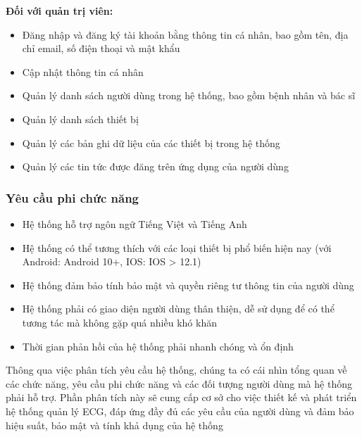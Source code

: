 \textbf{Đối với quản trị viên:}
\begin{adjustwidth}{1.5em}{}
\begin{itemize}
    \item Đăng nhập và đăng ký tài khoản bằng thông tin cá nhân, bao gồm tên, địa chỉ email, số điện thoại và mật khẩu
    \item Cập nhật thông tin cá nhân
    \item Quản lý danh sách người dùng trong hệ thống, bao gồm bệnh nhân và bác sĩ
    \item Quản lý danh sách thiết bị
    \item Quản lý các bản ghi dữ liệu của các thiết bị trong hệ thống
    \item Quản lý các tin tức được đăng trên ứng dụng của người dùng
\end{itemize}
\end{adjustwidth}

\subsubsection{Yêu cầu phi chức năng}
\begin{itemize}
    \item Hệ thống hỗ trợ ngôn ngữ Tiếng Việt và Tiếng Anh
    \item Hệ thống có thể tương thích với các loại thiết bị phổ biến hiện nay (với Android: Android 10+, IOS: IOS > 12.1)
    \item Hệ thống đảm bảo tính bảo mật và quyền riêng tư thông tin của người dùng
    \item Hệ thống phải có giao diện người dùng thân thiện, dễ sử dụng để có thể tương tác mà không gặp quá nhiều khó khăn
    \item Thời gian phản hồi của hệ thống phải nhanh chóng và ổn định
\end{itemize}

Thông qua việc phân tích yêu cầu hệ thống, chúng ta có cái nhìn tổng quan về các chức năng, yêu cầu phi chức năng và 
các đối tượng người dùng mà hệ thống phải hỗ trợ. Phần phân tích này sẽ cung cấp cơ sở cho việc thiết kế và phát triển hệ thống quản lý ECG, 
đáp ứng đầy đủ các yêu cầu của người dùng và đảm bảo hiệu suất, bảo mật và tính khả dụng của hệ thống


